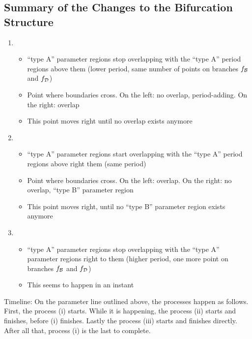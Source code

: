\subsection{Summary of the Changes to the Bifurcation Structure}

\begin{enumerate}
	\item \begin{itemize}
		      \item ``type A'' parameter regions stop overlapping with the ``type A'' period regions above them (lower period, same number of points on branches $f_{\mathcal{B}}$ and $f_{\mathcal{D}}$)
		      \item Point where boundaries cross. On the left: no overlap, period-adding. On the right: overlap
		      \item This point moves right until no overlap exists anymore
	      \end{itemize}
	\item \begin{itemize}
		      \item ``type A'' parameter regions start overlapping with the ``type A'' period regions above right them (same period)
		      \item Point where boundaries cross. On the left: overlap. On the right: no overlap, ``type B'' parameter region
		      \item This point moves right, until no ``type B'' parameter region exists anymore
	      \end{itemize}
	\item \begin{itemize}
		      \item ``type A'' parameter regions stop overlapping with the ``type A'' parameter regions right to them (higher period, one more point on branches $f_{\mathcal{B}}$ and $f_{\mathcal{D}}$)
		      \item This seems to happen in an instant
	      \end{itemize}
\end{enumerate}

Timeline:
On the parameter line outlined above, the processes happen as follows.
First, the process (i) starts.
While it is happening, the process (ii) starts and finishes, before (i) finishes.
Lastly the process (iii) starts and finishes directly.
After all that, process (i) is the last to complete.



